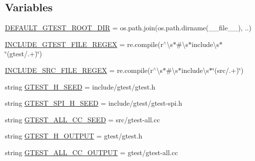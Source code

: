 \subsection*{Variables}
\begin{DoxyCompactItemize}
\item 
\hyperlink{namespacefuse__gtest__files_a68085bdb2912baa7e71d2b3eb37b05c9}{D\+E\+F\+A\+U\+L\+T\+\_\+\+G\+T\+E\+S\+T\+\_\+\+R\+O\+O\+T\+\_\+\+D\+IR} = os.\+path.\+join(os.\+path.\+dirname(\+\_\+\+\_\+file\+\_\+\+\_\+), \textquotesingle{}..\textquotesingle{})
\item 
\hyperlink{namespacefuse__gtest__files_ad7abe9bfa06bb1c5411e8b4a7a686e5b}{I\+N\+C\+L\+U\+D\+E\+\_\+\+G\+T\+E\+S\+T\+\_\+\+F\+I\+L\+E\+\_\+\+R\+E\+G\+EX} = re.\+compile(r\textquotesingle{}$^\wedge$\textbackslash{}s$\ast$\#\textbackslash{}s$\ast$include\textbackslash{}s$\ast$\char`\"{}(gtest/.+)\char`\"{}\textquotesingle{})
\item 
\hyperlink{namespacefuse__gtest__files_aec4e054d0ab27276d6150468bb98a8a4}{I\+N\+C\+L\+U\+D\+E\+\_\+\+S\+R\+C\+\_\+\+F\+I\+L\+E\+\_\+\+R\+E\+G\+EX} = re.\+compile(r\textquotesingle{}$^\wedge$\textbackslash{}s$\ast$\#\textbackslash{}s$\ast$include\textbackslash{}s$\ast$\char`\"{}(src/.+)\char`\"{}\textquotesingle{})
\item 
string \hyperlink{namespacefuse__gtest__files_ad897bce28100f2b97216929013519181}{G\+T\+E\+S\+T\+\_\+\+H\+\_\+\+S\+E\+ED} = \textquotesingle{}include/gtest/gtest.\+h\textquotesingle{}
\item 
string \hyperlink{namespacefuse__gtest__files_a891d03ce9cfe3577cb4c193f9544f17f}{G\+T\+E\+S\+T\+\_\+\+S\+P\+I\+\_\+\+H\+\_\+\+S\+E\+ED} = \textquotesingle{}include/gtest/gtest-\/spi.\+h\textquotesingle{}
\item 
string \hyperlink{namespacefuse__gtest__files_a162a6031d0d5743a37a4f79227d5e916}{G\+T\+E\+S\+T\+\_\+\+A\+L\+L\+\_\+\+C\+C\+\_\+\+S\+E\+ED} = \textquotesingle{}src/gtest-\/all.\+cc\textquotesingle{}
\item 
string \hyperlink{namespacefuse__gtest__files_a16437f87d0f7a9800885a9082a0b773e}{G\+T\+E\+S\+T\+\_\+\+H\+\_\+\+O\+U\+T\+P\+UT} = \textquotesingle{}gtest/gtest.\+h\textquotesingle{}
\item 
string \hyperlink{namespacefuse__gtest__files_aa66c14474599109c46ec24eaa0ad4217}{G\+T\+E\+S\+T\+\_\+\+A\+L\+L\+\_\+\+C\+C\+\_\+\+O\+U\+T\+P\+UT} = \textquotesingle{}gtest/gtest-\/all.\+cc\textquotesingle{}
\end{DoxyCompactItemize}


